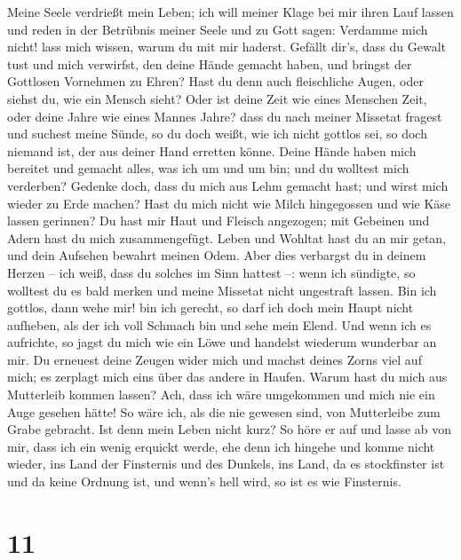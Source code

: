  Meine Seele verdrießt mein Leben; ich will meiner Klage
bei mir ihren Lauf lassen und reden in der Betrübnis meiner Seele
 und zu Gott sagen: Verdamme mich nicht! lass mich wissen,
warum du mit mir haderst.  Gefällt dir's, dass du Gewalt
tust und mich verwirfst, den deine Hände gemacht haben, und bringst der
Gottlosen Vornehmen zu Ehren?  Hast du denn auch
fleischliche Augen, oder siehst du, wie ein Mensch sieht? 
Oder ist deine Zeit wie eines Menschen Zeit, oder deine Jahre wie eines
Mannes Jahre?  dass du nach meiner Missetat fragest und
suchest meine Sünde,  so du doch weißt, wie ich nicht
gottlos sei, so doch niemand ist, der aus deiner Hand erretten könne.
 Deine Hände haben mich bereitet und gemacht alles, was
ich um und um bin; und du wolltest mich verderben? 
Gedenke doch, dass du mich aus Lehm gemacht hast; und wirst mich wieder
zu Erde machen?  Hast du mich nicht wie Milch hingegossen
und wie Käse lassen gerinnen?  Du hast mir Haut und
Fleisch angezogen; mit Gebeinen und Adern hast du mich zusammengefügt.
 Leben und Wohltat hast du an mir getan, und dein
Aufsehen bewahrt meinen Odem.  Aber dies verbargst du in
deinem Herzen -- ich weiß, dass du solches im Sinn hattest --:
 wenn ich sündigte, so wolltest du es bald merken und
meine Missetat nicht ungestraft lassen.  Bin ich gottlos,
dann wehe mir! bin ich gerecht, so darf ich doch mein Haupt nicht
aufheben, als der ich voll Schmach bin und sehe mein Elend.
 Und wenn ich es aufrichte, so jagst du mich wie ein Löwe
und handelst wiederum wunderbar an mir.  Du erneuest
deine Zeugen wider mich und machst deines Zorns viel auf mich; es
zerplagt mich eins über das andere in Haufen.  Warum hast
du mich aus Mutterleib kommen lassen? Ach, dass ich wäre umgekommen und
mich nie ein Auge gesehen hätte!  So wäre ich, als die
nie gewesen sind, von Mutterleibe zum Grabe gebracht. 
Ist denn mein Leben nicht kurz? So höre er auf und lasse ab von mir,
dass ich ein wenig erquickt werde,  ehe denn ich hingehe
und komme nicht wieder, ins Land der Finsternis und des Dunkels,
 ins Land, da es stockfinster ist und da keine Ordnung
ist, und wenn's hell wird, so ist es wie Finsternis.

\hypertarget{section-10}{%
\section{11}\label{section-10}}

